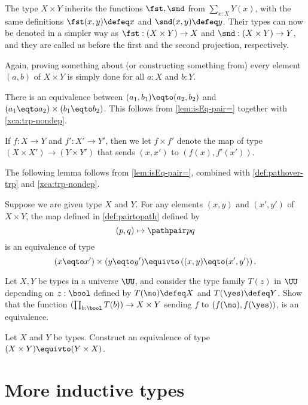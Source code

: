 The type $X \times Y$ inherits the functions $\fst,\snd$ from
$\sum_{x:X} Y(x)$, with the same definitions $\fst(x,y)\defeq x$
and $\snd(x,y)\defeq y$. Their types can now be denoted in a
simpler way as $\fst: (X \times Y)\to X$ and
$\snd: (X \times Y)\to Y$, and they are called as before the
first and the second projection, respectively.

Again, proving something about (or constructing something from) every
element $(a,b)$ of $X \times Y$ is simply done for all $a:X$ and $b:Y$.

There is an equivalence between $(a_1,b_1) \eqto (a_2,b_2)$ and $(a_1 \eqto a_2) \times (b_1 \eqto b_2)$.
This follows from \cref{lem:isEq-pair=} together with \cref{xca:trp-nondep}.

If $f: X \to Y$ and $f': X' \to Y'$, then we let
$f\times f'$ denote the map of type $(X\times X') \to (Y\times Y')$
that sends $(x,x')$ to $(f(x),f'(x'))$.

The following lemma follows from \cref{lem:isEq-pair=}, combined with \cref{def:pathover-trp} and \cref{xca:trp-nondep}.

\begin{lemma}\label{lem:isEq-pair-bin=}
  Suppose we are given type $X$ and $Y$.
  For any elements $(x,y)$ and $(x',y')$ of $X \times Y$,
  the map defined in \cref{def:pairtopath} defined by
  \[
    (p,q) \mapsto \pathpair p q
  \]
  is an equivalence of type
  \[
    ( x\eqto x' ) \times (y\eqto y') \equivto \left( (x,y)\eqto (x',y')\right).
  \]
\end{lemma}

\begin{xca}\label{xca:binary-prod-equiv}
  Let $X,Y$ be types in a universe $\UU$, and consider the type family
  $T(z)$ in $\UU$ depending on $z:\bool$ defined by
  $T(\no)\defeq X$ and $T(\yes) \defeq Y$.
  Show that the function $(\prod_{b:\bool}T(b))\to X\times Y$
  sending $f$ to $(f(\no),f(\yes))$, is an equivalence.
\end{xca}

\begin{xca}\label{xca:binary-prod-comm}
  Let $X$ and $Y$ be types.
  Construct an equivalence of type $(X \times Y) \equivto (Y\times X)$.
\end{xca}

\section{More inductive types}
\label{sec:inductive-types}

